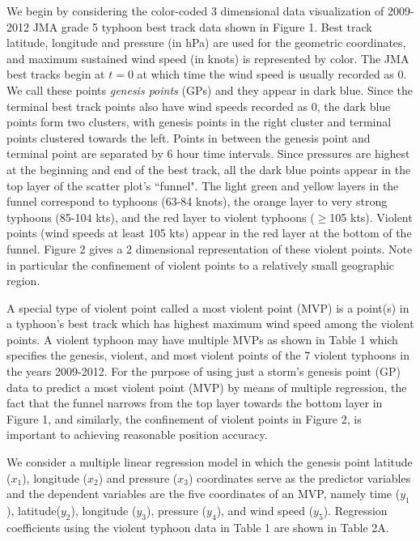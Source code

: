 \documentclass[a4paper, 12pt]{article}
\begin{document}
{We begin by considering the color-coded 3 dimensional data visualization of 2009-2012 JMA grade 5 typhoon best track data shown in Figure 1. Best track latitude, longitude and pressure (in hPa) are used for the geometric coordinates, and maximum sustained wind speed (in knots) is represented by color.  The JMA best tracks begin at $t=0$ at which time the wind speed is usually recorded as 0. We call these points \emph{genesis points} (GPs) and they appear in dark blue.  Since the terminal best track points also have wind speeds recorded as 0, the dark blue points form two clusters, with genesis points in the right cluster and terminal points clustered towards the left. Points in between the genesis point and terminal point are separated by 6 hour time intervals. Since pressures are highest at the beginning and end of the best track, all the dark blue points appear in the top layer of the scatter plot's ``funnel".  The light green and yellow layers in the funnel correspond to typhoons (63-84 knots), the orange layer to very strong typhoons (85-104 kts), and the red layer to violent typhoons ($\ge$105 kts). Violent points (wind speeds at least 105 kts) appear in the red layer at the bottom of the funnel. Figure 2 gives a 2 dimensional representation of these violent points. Note in particular the confinement of violent points to a relatively small geographic region.



A special type of violent point called a most violent point (MVP) is a point(s) in a typhoon's best track which has highest maximum wind speed among the violent points. A violent typhoon may have multiple MVPs as shown in Table 1 which specifies the genesis, violent, and most violent points of the 7 violent typhoons in the years 2009-2012. For the purpose of using just a storm's genesis point (GP)  data to predict a most violent point (MVP) by means of multiple regression, the fact that the funnel narrows from the top layer towards the bottom layer in Figure 1, and similarly, the confinement of violent points in Figure 2, is important to achieving reasonable position accuracy.


   We consider a multiple linear regression model in which the genesis point latitude ($x_1$), longitude ($x_2$) and pressure ($x_3$) coordinates serve as the predictor variables and the dependent variables are the five coordinates of an MVP, namely time ($y_1$), latitude($y_2$), longitude ($y_3$),  pressure ($y_4$), and wind speed ($y_5$). Regression coefficients using the violent typhoon data in Table 1 are shown in Table 2A.

}
\end{document}
